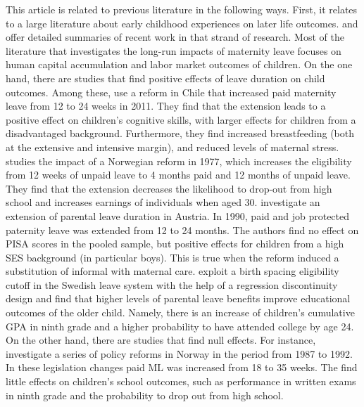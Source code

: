 \documentclass[11pt, a4paper,draft]{article} %
\begin{document}
This article is related to previous literature in the following ways. First, it relates to a large literature about early childhood experiences on later life outcomes. \cite{currie2011human} and \cite{almond2017childhood} offer detailed summaries of recent work in that strand of research. Most of the literature that investigates the long-run impacts of maternity leave focuses on human capital accumulation and labor market outcomes of children. 
On the one hand, there are studies that find positive effects of leave duration on child outcomes. Among these, \cite{albagli2018} use a reform in Chile that increased paid maternity leave from 12 to 24 weeks in 2011. They find that the extension leads to a positive effect on children's cognitive skills, with larger effects for children from a disadvantaged background. Furthermore, they find increased breastfeeding (both at the extensive and intensive margin), and reduced levels of maternal stress. \cite{carneiro2015flying} studies the impact of a Norwegian reform in 1977, which increases the eligibility from 12 weeks of unpaid leave to 4 months paid and 12 months of unpaid leave. They find that the extension decreases the likelihood to drop-out from high school and increases earnings of individuals when aged 30. \cite{danzer2017} investigate an extension of parental leave duration in Austria. In 1990, paid and job protected paternity leave was extended from 12 to 24 months. The authors find no effect on PISA scores in the pooled sample, but positive effects for children from a high SES background (in particular boys). This is true when the reform induced a substitution of informal with maternal care. \cite{ginja2020parental} exploit a birth spacing eligibility cutoff in the Swedish leave system with the help of a regression discontinuity design and find that higher levels of parental leave benefits improve educational outcomes of the older child. Namely, there is an increase of children's cumulative GPA in ninth grade and a higher probability to have attended college by age 24. On the other hand, there are studies that find null effects. For instance, \cite{Dahl2016Case} investigate a series of policy reforms in Norway in the period from 1987 to 1992. In these legislation changes paid ML was increased from 18 to 35 weeks. The find little effects on children's school outcomes, such as performance in written exams in ninth grade and the probability to drop out from high school. 
\end{document}
